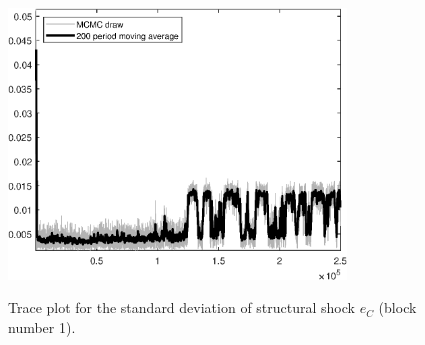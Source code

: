 \begin{figure}[H]
\centering
  \includegraphics[width=0.8\textwidth]{BRS_growth_ext_comovement/graphs/TracePlot_SE_e_C_blck_1}\\
    \caption{Trace plot for the standard deviation of structural shock ${e_C}$ (block number 1).}
\end{figure}
